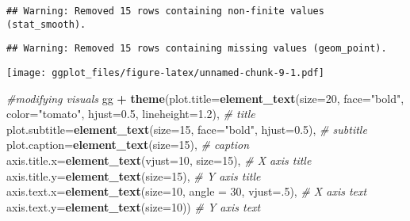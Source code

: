 \documentclass[]{article}
\newenvironment{Shaded}{\begin{snugshade}}{\end{snugshade}}
\newcommand{\KeywordTok}[1]{\textcolor[rgb]{0.13,0.29,0.53}{\textbf{#1}}}
\newcommand{\DataTypeTok}[1]{\textcolor[rgb]{0.13,0.29,0.53}{#1}}
\newcommand{\DecValTok}[1]{\textcolor[rgb]{0.00,0.00,0.81}{#1}}
\newcommand{\FloatTok}[1]{\textcolor[rgb]{0.00,0.00,0.81}{#1}}
\newcommand{\StringTok}[1]{\textcolor[rgb]{0.31,0.60,0.02}{#1}}
\newcommand{\CommentTok}[1]{\textcolor[rgb]{0.56,0.35,0.01}{\textit{#1}}}
\newcommand{\OperatorTok}[1]{\textcolor[rgb]{0.81,0.36,0.00}{\textbf{#1}}}
\newcommand{\NormalTok}[1]{#1}
\begin{document}
\begin{verbatim}
## Warning: Removed 15 rows containing non-finite values (stat_smooth).
\end{verbatim}

\begin{verbatim}
## Warning: Removed 15 rows containing missing values (geom_point).
\end{verbatim}

\texttt{[image: ggplot\_files/figure-latex/unnamed-chunk-9-1.pdf]}

\begin{Shaded}
\begin{Highlighting}[]
\CommentTok{#modifying visuals}
\NormalTok{gg }\OperatorTok{+}\StringTok{ }\KeywordTok{theme}\NormalTok{(}\DataTypeTok{plot.title=}\KeywordTok{element_text}\NormalTok{(}\DataTypeTok{size=}\DecValTok{20}\NormalTok{, }
                                    \DataTypeTok{face=}\StringTok{"bold"}\NormalTok{, }
                                    \DataTypeTok{color=}\StringTok{"tomato"}\NormalTok{,}
                                    \DataTypeTok{hjust=}\FloatTok{0.5}\NormalTok{,}
                                    \DataTypeTok{lineheight=}\FloatTok{1.2}\NormalTok{),  }\CommentTok{# title}
            \DataTypeTok{plot.subtitle=}\KeywordTok{element_text}\NormalTok{(}\DataTypeTok{size=}\DecValTok{15}\NormalTok{, }
                                       \DataTypeTok{face=}\StringTok{"bold"}\NormalTok{,}
                                       \DataTypeTok{hjust=}\FloatTok{0.5}\NormalTok{),  }\CommentTok{# subtitle}
            \DataTypeTok{plot.caption=}\KeywordTok{element_text}\NormalTok{(}\DataTypeTok{size=}\DecValTok{15}\NormalTok{),  }\CommentTok{# caption}
            \DataTypeTok{axis.title.x=}\KeywordTok{element_text}\NormalTok{(}\DataTypeTok{vjust=}\DecValTok{10}\NormalTok{,  }
                                      \DataTypeTok{size=}\DecValTok{15}\NormalTok{),  }\CommentTok{# X axis title}
            \DataTypeTok{axis.title.y=}\KeywordTok{element_text}\NormalTok{(}\DataTypeTok{size=}\DecValTok{15}\NormalTok{),  }\CommentTok{# Y axis title}
            \DataTypeTok{axis.text.x=}\KeywordTok{element_text}\NormalTok{(}\DataTypeTok{size=}\DecValTok{10}\NormalTok{, }
                                     \DataTypeTok{angle =} \DecValTok{30}\NormalTok{,}
                                     \DataTypeTok{vjust=}\NormalTok{.}\DecValTok{5}\NormalTok{),  }\CommentTok{# X axis text}
            \DataTypeTok{axis.text.y=}\KeywordTok{element_text}\NormalTok{(}\DataTypeTok{size=}\DecValTok{10}\NormalTok{))  }\CommentTok{# Y axis text}
\end{Highlighting}
\end{Shaded}
\end{document}
